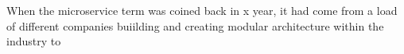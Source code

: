 When the microservice term was coined back in x year, it had come from a load of different companies buiilding and creating modular architecture within the industry to 





